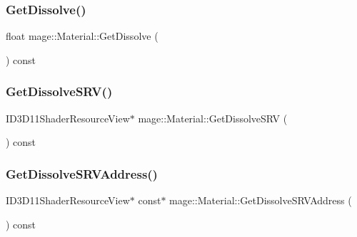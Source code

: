 \hypertarget{structmage_1_1_material_aa320c6b371b9f055a76821db71d185bc}{}\label{structmage_1_1_material_aa320c6b371b9f055a76821db71d185bc} 
\subsubsection{\texorpdfstring{Get\+Dissolve()}{GetDissolve()}}
{\footnotesize\ttfamily float mage\+::\+Material\+::\+Get\+Dissolve (\begin{DoxyParamCaption}{ }\end{DoxyParamCaption}) const\hspace{0.3cm}{\ttfamily [noexcept]}}

\hypertarget{structmage_1_1_material_adb87e492a57c7539776a311a2e454167}{}\label{structmage_1_1_material_adb87e492a57c7539776a311a2e454167} 
\subsubsection{\texorpdfstring{Get\+Dissolve\+S\+R\+V()}{GetDissolveSRV()}}
{\footnotesize\ttfamily I\+D3\+D11\+Shader\+Resource\+View$\ast$ mage\+::\+Material\+::\+Get\+Dissolve\+S\+RV (\begin{DoxyParamCaption}{ }\end{DoxyParamCaption}) const\hspace{0.3cm}{\ttfamily [noexcept]}}

\hypertarget{structmage_1_1_material_a9a50e538b24f15129fd95c1272fc82be}{}\label{structmage_1_1_material_a9a50e538b24f15129fd95c1272fc82be} 
\subsubsection{\texorpdfstring{Get\+Dissolve\+S\+R\+V\+Address()}{GetDissolveSRVAddress()}}
{\footnotesize\ttfamily I\+D3\+D11\+Shader\+Resource\+View$\ast$ const$\ast$ mage\+::\+Material\+::\+Get\+Dissolve\+S\+R\+V\+Address (\begin{DoxyParamCaption}{ }\end{DoxyParamCaption}) const\hspace{0.3cm}{\ttfamily [noexcept]}}


